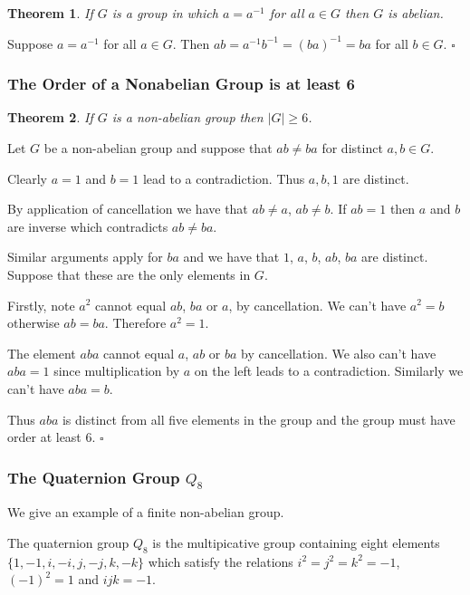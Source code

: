 \documentclass[10pt]{article}
\newtheorem{theorem}{Theorem}[section]
\newenvironment{proof}[1][Proof]{\begin{trivlist}
\item[\hskip \labelsep {\itshape #1}]}{\end{trivlist}}
\newenvironment{definition}[1][Definition]{\begin{trivlist}
\item[\hskip \labelsep {\bfseries #1}]}{\end{trivlist}}
\begin{document}
\begin{theorem}
If $G$ is a group in which $a = a^{-1}$ for all $a \in G$ then $G$ is abelian.
\end{theorem}

\begin{proof}
Suppose $a = a^{-1}$ for all $a \in G$. Then $ab = a^{-1}b^{-1} = (ba)^{-1} = ba$ for all $b \in G$. $\square$
\end{proof}

\subsubsection{The Order of a Nonabelian Group is at least 6}

\begin{theorem}
If $G$ is a non-abelian group then $|G| \geq 6$.
\end{theorem}

\begin{proof}
Let $G$ be a non-abelian group and suppose that $ab \neq ba$ for distinct $a, b \in G$.

Clearly $a = 1$ and $b = 1$ lead to a contradiction. Thus $a, b, 1$ are distinct.

By application of cancellation we have that $ab \neq a$, $ab \neq b$. If $ab = 1$ then $a$ and $b$ are inverse which contradicts $ab \neq ba$. 

Similar arguments apply for $ba$ and we have that $1$, $a$, $b$, $ab$, $ba$ are distinct. Suppose that these are the only elements in $G$.

Firstly, note $a^2$ cannot equal $ab$, $ba$ or $a$, by cancellation. We can't have $a^2 = b$ otherwise $ab = ba$. Therefore $a^2 = 1$.

The element $aba$ cannot equal $a$, $ab$ or $ba$ by cancellation. We also can't have $aba = 1$ since multiplication by $a$ on the left leads to a contradiction. Similarly we can't have $aba = b$.

Thus $aba$ is distinct from all five elements in the group and the group must have order at least $6$. $\square$
\end{proof}

\subsubsection{The Quaternion Group $Q_8$}

We give an example of a finite non-abelian group.

\begin{definition}
The quaternion group $Q_8$ is the multipicative group containing eight elements $\{1, -1, i, -i, j, -j, k, -k\}$ which satisfy the relations $i^2 = j^2 = k^2 = -1$, $(-1)^2 = 1$ and $ijk = -1$.
\end{definition}
\end{document}
